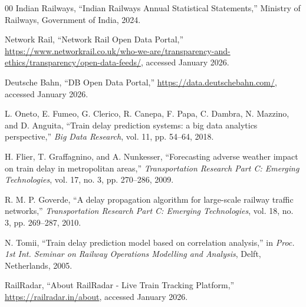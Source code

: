 \documentclass[conference]{IEEEtran}
\begin{document}
\begin{thebibliography}{00}
 Indian Railways, ``Indian Railways Annual Statistical Statements,'' Ministry of Railways, Government of India, 2024.

 Network Rail, ``Network Rail Open Data Portal,'' \url{https://www.networkrail.co.uk/who-we-are/transparency-and-ethics/transparency/open-data-feeds/}, accessed January 2026.

 Deutsche Bahn, ``DB Open Data Portal,'' \url{https://data.deutschebahn.com/}, accessed January 2026.

 L. Oneto, E. Fumeo, G. Clerico, R. Canepa, F. Papa, C. Dambra, N. Mazzino, and D. Anguita, ``Train delay prediction systems: a big data analytics perspective,'' \textit{Big Data Research}, vol. 11, pp. 54--64, 2018.

 H. Flier, T. Graffagnino, and A. Nunkesser, ``Forecasting adverse weather impact on train delay in metropolitan areas,'' \textit{Transportation Research Part C: Emerging Technologies}, vol. 17, no. 3, pp. 270--286, 2009.

 R. M. P. Goverde, ``A delay propagation algorithm for large-scale railway traffic networks,'' \textit{Transportation Research Part C: Emerging Technologies}, vol. 18, no. 3, pp. 269--287, 2010.

 N. Tomii, ``Train delay prediction model based on correlation analysis,'' in \textit{Proc. 1st Int. Seminar on Railway Operations Modelling and Analysis}, Delft, Netherlands, 2005.

 RailRadar, ``About RailRadar - Live Train Tracking Platform,'' \url{https://railradar.in/about}, accessed January 2026.

\end{thebibliography}
\end{document}
